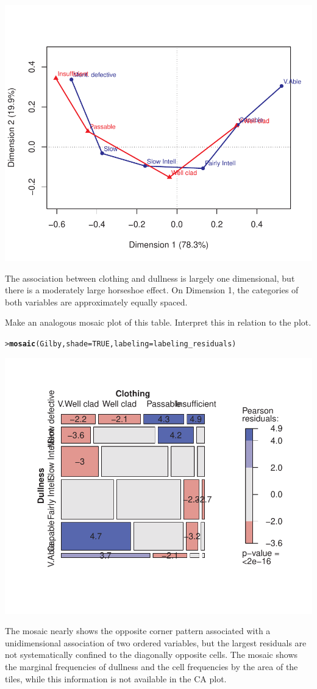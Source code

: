 \documentclass[10pt]{report}\usepackage[]{graphicx}\usepackage[]{color}
\makeatletter
\newcommand{\hlnum}[1]{\textcolor[rgb]{0.686,0.059,0.569}{#1}}%
\newcommand{\hlstd}[1]{\textcolor[rgb]{0.345,0.345,0.345}{#1}}%
\newcommand{\hlkwc}[1]{\textcolor[rgb]{0.333,0.667,0.333}{#1}}%
\newcommand{\hlkwd}[1]{\textcolor[rgb]{0.737,0.353,0.396}{\textbf{#1}}}%
\newenvironment{kframe}{%
 \def\at@end@of@kframe{}%
 \ifinner\ifhmode%
  \def\at@end@of@kframe{\end{minipage}}%
  \begin{minipage}{\columnwidth}%
 \fi\fi%
 \def\FrameCommand##1{\hskip\@totalleftmargin \hskip-\fboxsep
 \colorbox{shadecolor}{##1}\hskip-\fboxsep
     \hskip-\linewidth \hskip-\@totalleftmargin \hskip\columnwidth}%
 \MakeFramed {\advance\hsize-\width
   \@totalleftmargin\z@ \linewidth\hsize
   \@setminipage}}%
 {\par\unskip\endMakeFramed%
 \at@end@of@kframe}
\newenvironment{knitrout}{}{} %
\renewenvironment{knitrout}{\small\renewcommand{\baselinestretch}{.85}}{} %
\makeatother
\begin{document}
\begin{Exercises}
\begin{enumerate*}
\begin{ans}
\begin{knitrout}
\centerline{\includegraphics[width=.5\textwidth]{soln/fig/ex6_6a-1} }



\end{knitrout}
    The association between clothing and dullness is largely one dimensional, but there is a moderately
    large horseshoe effect.  On Dimension 1, the categories of both variables are approximately equally
    spaced.
    \end{ans}
    
    \item Make an analogous mosaic plot of this table.  Interpret this in relation to the \ca plot.
    \begin{ans}
\begin{knitrout}\footnotesize
{}\color{fgcolor}\begin{kframe}
\begin{alltt}
\hlstd{> }\hlkwd{mosaic}\hlstd{(Gilby,} \hlkwc{shade}\hlstd{=}\hlnum{TRUE}\hlstd{,} \hlkwc{labeling}\hlstd{=labeling_residuals)}
\end{alltt}
\end{kframe}

\centerline{\includegraphics[width=.5\textwidth]{soln/fig/ex6_6b-1} }



\end{knitrout}
    The mosaic nearly shows the opposite corner pattern associated with a unidimensional
    association of two ordered variables, but the largest residuals are not
    systematically confined to the diagonally opposite cells.
    The mosaic shows the marginal frequencies of dullness and the cell frequencies
    by the area of the tiles, while this information is not available in the CA
    plot.
    \end{ans}
    

\end{enumerate*}
\end{Exercises}
\end{document}
